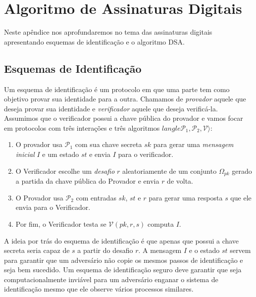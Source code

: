 \chapter{Algoritmo de Assinaturas Digitais}
\label{cha:dsa}

Neste apêndice nos aprofundaremos no tema das assinaturas digitais apresentando esquemas de identificação e o algoritmo DSA.

\section{Esquemas de Identificação}
\label{sec:esqu-de-ident}

Um esquema de identificação é um protocolo em que uma parte tem como objetivo provar sua identidade para a outra.
Chamamos de {\em provador} aquele que deseja provar sua identidade e {\em verificador} aquele que deseja verificá-la.
Assumimos que o verificador possui a chave pública do provador e vamos focar em protocolos com três interações e três algoritmos $langle \mathcal{P}_1, \mathcal{P}_2, \mathcal{V} \rangle$:
\begin{enumerate}
\item O provador usa $\mathcal{P}_1$ com sua chave secreta $sk$ para gerar uma {\em mensagem inicial} $I$ e um estado $st$ e envia $I$ para o verificador.
\item O Verificador escolhe um {\em desafio} $r$ aleatoriamente de um conjunto $\Omega_{pk}$ gerado a partida da chave pública do Provador e envia $r$  de volta.
\item O Provador usa $\mathcal{P}_2$ com entradas $sk$, $st$ e $r$ para gerar uma resposta $s$ que ele envia para o Verificador.
\item Por fim, o Verificador testa se $\mathcal{V}(pk, r, s)$ computa $I$.
\end{enumerate}


A ideia por trás do esquema de identificação é que apenas que possui a chave secreta seria capaz de $s$ a partir do desafio $r$.
A mensagem $I$ e o estado $st$ servem para garantir que um adversário não copie os mesmos passos de identificação e seja bem sucedido.
Um esquema de identificação seguro deve garantir que seja computacionalmente inviável para um adversário enganar o sistema de identificação mesmo que ele observe vários processos similares.


